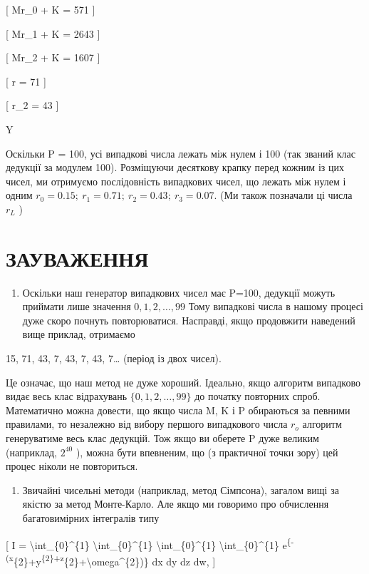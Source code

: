 \documentclass[
]{article}
\providecommand{\tightlist}{%
  \setlength{\itemsep}{0pt}\setlength{\parskip}{0pt}}
\begin{document}
{[} Mr\_0 + K = 571 {]}

{[} Mr\_1 + K = 2643 {]}

{[} Mr\_2 + K = 1607 {]}

{[} r = 71 {]}

{[} r\_2 = 43 {]}

Y

Оскільки P = 100, усі випадкові числа лежать між нулем і 100 (так званий
клас дедукції за модулем 100). Розміщуючи десяткову крапку перед кожним
із цих чисел, ми отримуємо послідовність випадкових чисел, що лежать між
нулем і одним \(r_0=0.15;\ r_1=0.71;\ r_2=0.43;\ r_3=0.07.\) (Ми також
позначали ці числа \(r_L\) )

\section{ЗАУВАЖЕННЯ}\label{ux437ux430ux443ux432ux430ux436ux435ux43dux43dux44f-6}

\begin{enumerate}
\def\labelenumi{\arabic{enumi}.}
\tightlist
\item
  Оскільки наш генератор випадкових чисел має P=100, дедукції можуть
  приймати лише значення \(0,1,2,\ldots,99\) Тому випадкові числа в
  нашому процесі дуже скоро почнуть повторюватися. Насправді, якщо
  продовжити наведений вище приклад, отримаємо
\end{enumerate}

15, 71, 43, 7, 43, 7, 43, 7\ldots{} (період із двох чисел).

Це означає, що наш метод не дуже хороший. Ідеально, якщо алгоритм
випадково видає весь клас відрахувань \(\{0, 1, 2, \ldots, 99\}\) до
початку повторних спроб. Математично можна довести, що якщо числа M, K і
P обираються за певними правилами, то незалежно від вибору першого
випадкового числа \(r_o\) алгоритм генеруватиме весь клас дедукцій. Тож
якщо ви оберете P дуже великим (наприклад, \(2^{40}\) ), можна бути
впевненим, що (з практичної точки зору) цей процес ніколи не
повториться.

\begin{enumerate}
\def\labelenumi{\arabic{enumi}.}
\setcounter{enumi}{1}
\tightlist
\item
  Звичайні чисельні методи (наприклад, метод Сімпсона), загалом вищі за
  якістю за метод Монте-Карло. Але якщо ми говоримо про обчислення
  багатовимірних інтегралів типу
\end{enumerate}

{[} I = \textbackslash int\_\{0\}\^{}\{1\}
\textbackslash int\_\{0\}\^{}\{1\} \textbackslash int\_\{0\}\^{}\{1\}
\textbackslash int\_\{0\}\^{}\{1\}
e\textsuperscript{\{-(x}\{2\}+y\textsuperscript{\{2\}+z}\{2\}+\textbackslash omega\^{}\{2\})\}
dx dy dz dw, {]}
\end{document}
